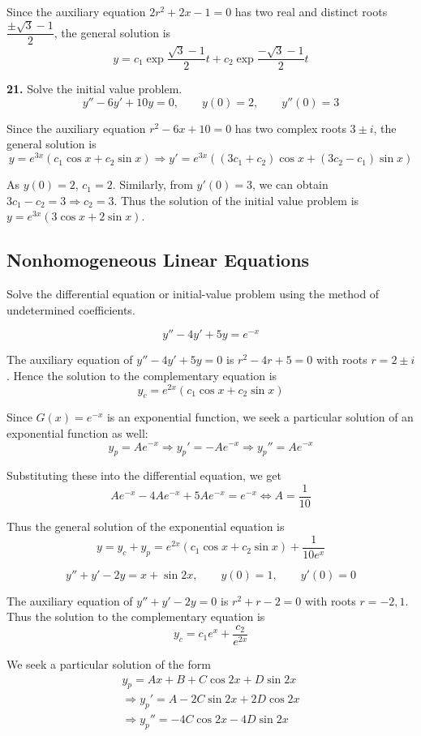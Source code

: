 \documentclass[a4paper,12pt]{article}
\newcommand{\exercise}[1]{\noindent\textbf{#1.}}
\begin{document}
Since the auxiliary equation $2r^2 + 2x - 1 = 0$ has two real and distinct
roots $\dfrac{\pm\sqrt 3 - 1}{2}$, the general solution is
\[y = c_1\exp\frac{\sqrt 3 - 1}{2}t + c_2\exp\frac{-\sqrt 3 - 1}{2}t\]

\exercise{21} Solve the initial value problem.
\[y'' - 6y' + 10y = 0,\qquad y(0) = 2,\qquad y''(0) = 3\]

Since the auxiliary equation $r^2 - 6x + 10 = 0$ has two complex roots
$3\pm i$, the general solution is
\[y = e^{3x}(c_1\cos x + c_2\sin x)
\Longrightarrow y' = e^{3x}((3c_1 + c_2)\cos x + (3c_2 - c_1)\sin x)\]

As $y(0) = 2$, $c_1 = 2$. Similarly, from $y'(0) = 3$,
we can obtain $3c_1 - c_2 = 3 \Longrightarrow c_2 = 3$. Thus the solution
of the initial value problem is $y = e^{3x}(3\cos x + 2\sin x)$.

\subsection{Nonhomogeneous Linear Equations}
Solve the differential equation or initial-value problem using the method of
undetermined coefficients.

\[y'' - 4y' + 5y = e^{-x}\tag{5}\]

The auxiliary equation of $y'' - 4y' + 5y = 0$ is $r^2 - 4r + 5 = 0$ with roots
$r = 2\pm i$. Hence the solution to the complementary equation is
\[y_c = e^{2x}(c_1\cos x + c_2\sin x)\]

Since $G(x) = e^{-x}$ is an exponential function, we seek a particular solution
of an exponential function as well:
\[y_p = Ae^{-x}
\Longrightarrow y_p' = -Ae^{-x}
\Longrightarrow y_p'' = Ae^{-x}\]

Substituting these into the differential equation, we get
\[Ae^{-x} - 4Ae^{-x} + 5Ae^{-x} = e^{-x} \iff A = \frac{1}{10}\]

Thus the general solution of the exponential equation is
\[y = y_c + y_p = e^{2x}(c_1\cos x + c_2\sin x) + \frac{1}{10e^x}\]

\[y'' + y' - 2y = x + \sin 2x,\qquad y(0) = 1,\qquad y'(0) = 0\tag{10}\]

The auxiliary equation of $y'' + y' - 2y = 0$ is $r^2 + r - 2 = 0$ with roots
$r = -2, 1$. Thus the solution to the complementary equation is
\[y_c = c_1 e^x + \frac{c_2}{e^{2x}}\]

We seek a particular solution of the form
\begin{multline*}
  y_p = Ax + B + C\cos 2x + D\sin 2x\\
  \Longrightarrow y_p' = A - 2C\sin 2x + 2D\cos 2x\\
  \Longrightarrow y_p'' = -4C\cos 2x - 4D\sin 2x
\end{multline*}
\end{document}
